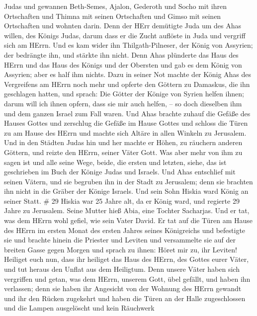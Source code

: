 Judas und gewannen Beth-Semes, Ajalon, Gederoth und Socho mit ihren
Ortschaften und Thimna mit seinen Ortschaften und Gimso mit seinen
Ortschaften und wohnten darin.  Denn der HErr demütigte
Juda um des Ahas willen, des Königs Judas, darum dass er die Zucht
auflöste in Juda und vergriff sich am HErrn.  Und es kam
wider ihn Thilgath-Pilneser, der König von Assyrien; der bedrängte ihn,
und stärkte ihn nicht.  Denn Ahas plünderte das Haus des
HErrn und das Haus des Königs und der Obersten und gab es dem König von
Assyrien; aber es half ihm nichts.  Dazu in seiner Not
machte der König Ahas des Vergreifens am HErrn noch mehr 
und opferte den Göttern zu Damaskus, die ihn geschlagen hatten, und
sprach: Die Götter der Könige von Syrien helfen ihnen; darum will ich
ihnen opfern, dass sie mir auch helfen, -- so doch dieselben ihm und dem
ganzen Israel zum Fall waren.  Und Ahas brachte zuhauf die
Gefäße des Hauses Gottes und zerschlug die Gefäße im Hause Gottes und
schloss die Türen zu am Hause des HErrn und machte sich Altäre in allen
Winkeln zu Jerusalem.  Und in den Städten Judas hin und her
machte er Höhen, zu räuchern anderen Göttern, und reizte den HErrn,
seiner Väter Gott.  Was aber mehr von ihm zu sagen ist und
alle seine Wege, beide, die ersten und letzten, siehe, das ist
geschrieben im Buch der Könige Judas und Israels.  Und Ahas
entschlief mit seinen Vätern, und sie begruben ihn in der Stadt zu
Jerusalem; denn sie brachten ihn nicht in die Gräber der Könige Israels.
Und sein Sohn Hiskia ward König an seiner Statt. \# 29 
Hiskia war 25 Jahre alt, da er König ward, und regierte 29 Jahre zu
Jerusalem. Seine Mutter hieß Abia, eine Tochter Sacharjas. 
Und er tat, was dem HErrn wohl gefiel, wie sein Vater David.
 Er tat auf die Türen am Hause des HErrn im ersten Monat des
ersten Jahres seines Königreichs und befestigte sie  und
brachte hinein die Priester und Leviten und versammelte sie auf der
breiten Gasse gegen Morgen  und sprach zu ihnen: Höret mir
zu, ihr Leviten! Heiliget euch nun, dass ihr heiliget das Haus des
HErrn, des Gottes eurer Väter, und tut heraus den Unflat aus dem
Heiligtum.  Denn unsere Väter haben sich vergriffen und
getan, was dem HErrn, unserem Gott, übel gefällt, und haben ihn
verlassen; denn sie haben ihr Angesicht von der Wohnung des HErrn
gewandt und ihr den Rücken zugekehrt  und haben die Türen an
der Halle zugeschlossen und die Lampen ausgelöscht und kein Räuchwerk
